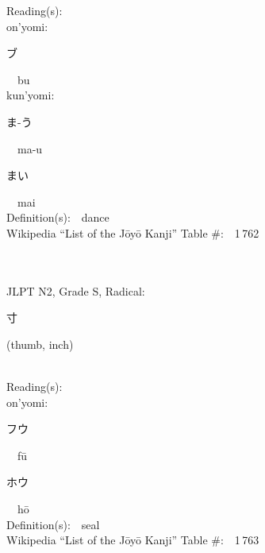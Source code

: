 \begin{multicols}{2}
Reading(s):\ \ \\
{\hspace*{1em}}on'yomi:\ \ \\
{\hspace*{2em}}{\begin{CJK}{UTF8}{min} ブ \end{CJK}}\ \ bu\ \ \\
{\hspace*{1em}}kun'yomi:\ \ \\
{\hspace*{2em}}{\begin{CJK}{UTF8}{min} ま-う \end{CJK}}\ \ ma-u\ \ \\
{\hspace*{2em}}{\begin{CJK}{UTF8}{min} まい \end{CJK}}\ \ mai\ \ \\
Definition(s):\ \ dance \\
Wikipedia ``List of the J\=oy\=o Kanji'' Table \#:\ \ 1\,762 \\
\ \ \\
{\fontsize{34pt}{40pt}  }\ \ \\  %
{JLPT N2, Grade S, Radical:\ \ {\begin{CJK}{UTF8}{min} 寸 \end{CJK}} (thumb, inch) } \\
Reading(s):\ \ \\
{\hspace*{1em}}on'yomi:\ \ \\
{\hspace*{2em}}{\begin{CJK}{UTF8}{min} フウ \end{CJK}}\ \ f\=u\ \ \\
{\hspace*{2em}}{\begin{CJK}{UTF8}{min} ホウ \end{CJK}}\ \ h\=o\ \ \\
Definition(s):\ \ seal \\
Wikipedia ``List of the J\=oy\=o Kanji'' Table \#:\ \ 1\,763 \\
\ \ \\
{\fontsize{34pt}{40pt}  }\ \ \\  %

\end{multicols}
